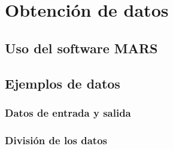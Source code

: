 \chapter{Obtención de datos}\label{ch:ObtencionDatos}

\section{Uso del software MARS}

\section{Ejemplos de datos}

\subsection{Datos de entrada y salida}

\subsection{División de los datos}